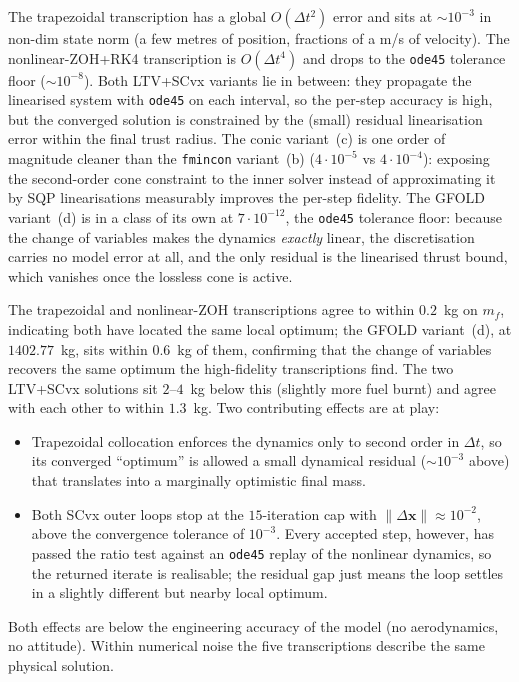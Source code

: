 \documentclass[../main.tex]{subfiles}
\begin{document}
The trapezoidal transcription has a global $O(\Delta t^2)$ error and sits at $\sim 10^{-3}$ in non-dim state norm (a few metres of position, fractions of a m/s of velocity). The nonlinear-ZOH+RK4 transcription is $O(\Delta t^4)$ and drops to the \texttt{ode45} tolerance floor ($\sim 10^{-8}$). Both LTV+SCvx variants lie in between: they propagate the linearised system with \texttt{ode45} on each interval, so the per-step accuracy is high, but the converged solution is constrained by the (small) residual linearisation error within the final trust radius. The conic variant~(c) is one order of magnitude cleaner than the \texttt{fmincon} variant~(b) ($4\cdot 10^{-5}$ vs $4\cdot 10^{-4}$): exposing the second-order cone constraint to the inner solver instead of approximating it by SQP linearisations measurably improves the per-step fidelity. The GFOLD variant~(d) is in a class of its own at $7\cdot 10^{-12}$, the \texttt{ode45} tolerance floor: because the change of variables makes the dynamics \emph{exactly} linear, the discretisation carries no model error at all, and the only residual is the linearised thrust bound, which vanishes once the lossless cone is active.

The trapezoidal and nonlinear-ZOH transcriptions agree to within $0.2$~kg on $m_f$, indicating both have located the same local optimum; the GFOLD variant~(d), at $1402.77$~kg, sits within $0.6$~kg of them, confirming that the change of variables recovers the same optimum the high-fidelity transcriptions find. The two LTV+SCvx solutions sit $2$--$4$~kg below this (slightly more fuel burnt) and agree with each other to within $1.3$~kg. Two contributing effects are at play:
\begin{itemize}
    \item Trapezoidal collocation enforces the dynamics only to second order in $\Delta t$, so its converged ``optimum'' is allowed a small dynamical residual ($\sim 10^{-3}$ above) that translates into a marginally optimistic final mass.
    \item Both SCvx outer loops stop at the $15$-iteration cap with $\|\Delta\mathbf{x}\| \approx 10^{-2}$, above the convergence tolerance of $10^{-3}$. Every accepted step, however, has passed the ratio test against an \texttt{ode45} replay of the nonlinear dynamics, so the returned iterate is realisable; the residual gap just means the loop settles in a slightly different but nearby local optimum.
\end{itemize}
Both effects are below the engineering accuracy of the model (no aerodynamics, no attitude). Within numerical noise the five transcriptions describe the same physical solution.
\end{document}
